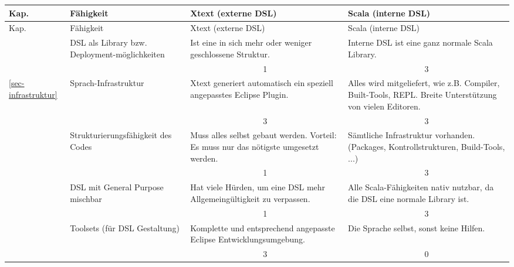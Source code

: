 \begin{landscape}
\begin{longtable}{|p{0.8cm}|p{4.4cm}|p{6.4cm}|p{6.4cm}|}

  \hline
  Kap. & Fähigkeit & Xtext (externe DSL) & Scala (interne DSL) \\ \hline \hline
  \endfirsthead

  \hline
  Kap. & Fähigkeit & Xtext (externe DSL) & Scala (interne DSL) \\ \hline
  \endhead

  & DSL als Library bzw. Deployment-möglichkeiten
  & Ist eine in sich mehr oder weniger geschlossene Struktur.
  & Interne DSL ist eine ganz normale Scala Library.
  \\
  \cline{3-4}
  & & \multicolumn{1}{c|}{ 1 } & \multicolumn{1}{c|}{ 3 } \\ \hline

  \ref{sec-infrastruktur}
  & Sprach-Infrastruktur
  & Xtext generiert automatisch ein speziell angepasstes Eclipse Plugin.
  & Alles wird mitgeliefert, wie z.B. Compiler, Built-Tools, REPL.
    Breite Unterstützung von vielen Editoren.
  \\
  \cline{3-4}
  & & \multicolumn{1}{c|}{ 3 } & \multicolumn{1}{c|}{ 3 } \\ \hline

  & Strukturierungsfähigkeit des Codes
  & Muss alles selbst gebaut werden. Vorteil: Es muss nur das nötigste
    umgesetzt werden.
  & Sämtliche Infrastruktur vorhanden. (Packages, Kontrollstrukturen,
    Build-Tools, ...)
  \\
  \cline{3-4}
  & & \multicolumn{1}{c|}{ 1 } & \multicolumn{1}{c|}{ 3 } \\ \hline

  & DSL mit General Purpose mischbar
  & Hat viele Hürden, um eine DSL mehr Allgemeingültigkeit zu verpassen.
  & Alle Scala-Fähigkeiten nativ nutzbar, da die DSL eine normale Library ist.
  \\
  \cline{3-4}
  & & \multicolumn{1}{c|}{ 1 } & \multicolumn{1}{c|}{ 3 } \\ \hline

  & Toolsets (für DSL Gestaltung)
  & Komplette und entsprechend angepasste Eclipse Entwicklungsumgebung.
  & Die Sprache selbst, sonst keine Hilfen.
  \\
  \cline{3-4}
  & & \multicolumn{1}{c|}{ 3 } & \multicolumn{1}{c|}{ 0 } \\ \hline


\end{longtable}
\end{landscape}
